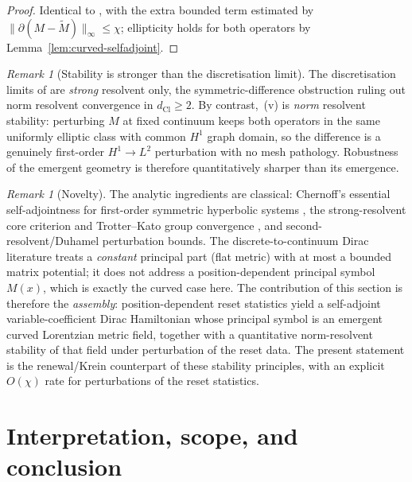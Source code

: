 \documentclass[11pt]{article}
\theoremstyle{definition}
\theoremstyle{remark}
\newtheorem{remark}[theorem]{Remark}
\newcommand{\dCl}{d_{\mathrm{Cl}}}
\newcommand{\norm}[1]{\lVert#1\rVert}
\begin{document}
\begin{proof}
Identical to , with the extra bounded term estimated by
$\norm{\partial(M-\tilde M)}_\infty\le\chi$; ellipticity holds for both operators
by Lemma~\ref{lem:curved-selfadjoint}.
\end{proof}

\begin{remark}[Stability is stronger than the discretisation limit]
\label{rem:stability-stronger}
The discretisation limits of  are
\emph{strong} resolvent only, the symmetric-difference obstruction
\cite{corneangardejensen2022,schmidtumeda2023} ruling out norm resolvent
convergence in $\dCl\ge2$.  By contrast, \,(v) is \emph{norm}
resolvent stability: perturbing $M$ at fixed continuum keeps both operators in
the same uniformly elliptic class with common $H^1$ graph domain, so the
difference is a genuinely first-order $H^1\to L^2$ perturbation with no mesh
pathology.  Robustness of the emergent geometry is
therefore quantitatively sharper than its emergence.
\end{remark}

\begin{remark}[Novelty]
\label{rem:novelty-curved}
The analytic ingredients are classical: Chernoff's essential self-adjointness for
first-order symmetric hyperbolic systems \cite{chernoff1973}, the
strong-resolvent core criterion and Trotter--Kato group convergence
\cite{reedsimon1}, and second-resolvent/Duhamel perturbation bounds.  The
discrete-to-continuum Dirac literature
\cite{corneangardejensen2022,schmidtumeda2023} treats a \emph{constant} principal
part (flat metric) with at most a bounded matrix potential; it does not address a
position-dependent principal symbol $M(x)$, which is exactly the curved case here.
The contribution of this section is therefore the \emph{assembly}: position-dependent
reset statistics yield a self-adjoint variable-coefficient Dirac Hamiltonian whose
principal symbol is an emergent curved Lorentzian metric field, together with a
quantitative norm-resolvent stability of that field under perturbation of the reset
data.  The present statement is the renewal/Krein counterpart of these stability principles,
with an explicit $O(\chi)$ rate for perturbations of the reset statistics.
\end{remark}

\section{Interpretation, scope, and conclusion}
\end{document}
